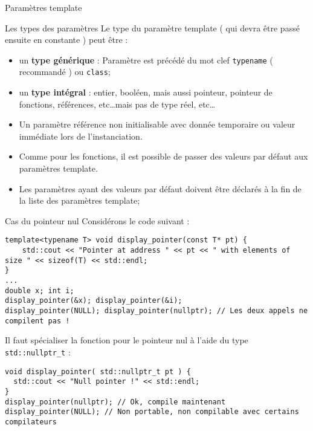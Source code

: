 \documentclass[handout,10pt]{beamer}
\begin{document}
\begin{frame}[fragile]{Paramètres template}
\tiny
\begin{block}{Les types des paramètres}
Le type du paramètre template ( qui devra être passé ensuite en constante ) peut être :
\begin{itemize}
\item  un \textbf{type générique} : Paramètre est précédé du mot clef \lstinline$typename$ ( recommandé ) ou \lstinline$class$;
\item un \textbf{type intégral} : entier, booléen, mais aussi pointeur, pointeur de fonctions, références, etc\ldots mais pas de type réel, etc\ldots
\item Un paramètre référence non initialisable avec donnée temporaire ou valeur immédiate lors de l'instanciation.
\item Comme pour les fonctions, il est possible de passer des valeurs par défaut aux paramètres template.
\item Les paramètres ayant des valeurs par défaut doivent être déclarés à la fin de la liste des paramètres template;
\end{itemize}
\end{block}

\begin{block}{Cas du pointeur nul}
Considérons le code suivant :
\begin{lstlisting}
template<typename T> void display_pointer(const T* pt) {
    std::cout << "Pointer at address " << pt << " with elements of size " << sizeof(T) << std::endl;
}
...
double x; int i;
display_pointer(&x); display_pointer(&i);
display_pointer(NULL); display_pointer(nullptr); // Les deux appels ne compilent pas !
\end{lstlisting}
Il faut spécialiser la fonction pour le pointeur nul à l'aide du type \lstinline$std::nullptr_t$ :
\begin{lstlisting}
void display_pointer( std::nullptr_t pt ) {
  std::cout << "Null pointer !" << std::endl;
}
display_pointer(nullptr); // Ok, compile maintenant
display_pointer(NULL); // Non portable, non compilable avec certains compilateurs
\end{lstlisting}
\end{block}
\end{frame}
\end{document}
